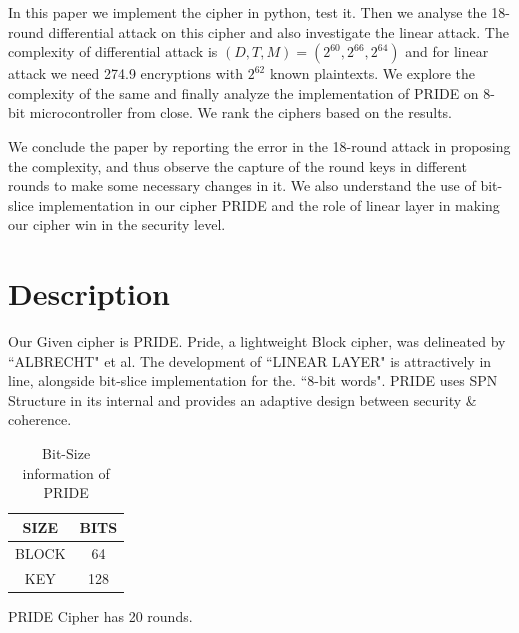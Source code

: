 \documentclass{transcrypto}
\begin{document}
	In this paper we implement the cipher in python, test it. Then we analyse the 18-round differential attack on this cipher and also investigate the linear attack. The complexity of differential attack is $ (D,T,M) = (2^{60},2^{66},2^{64}) $ and for linear attack we need 274.9 encryptions with $ 2^{62} $ known plaintexts. We explore the complexity of the same and finally analyze the implementation of PRIDE on 8-bit microcontroller from close. We rank the ciphers based on the results.
	
	We conclude the paper by reporting the error in the 18-round attack in proposing the complexity, and thus observe the capture of the round keys in different rounds to make some necessary changes in it. We also understand the use of bit-slice implementation in our cipher PRIDE and the role of linear layer in making our cipher win in the security level.
	\section{Description}
	Our Given cipher is PRIDE\cite{10.1007/978-3-662-44371-2_4}. Pride, a lightweight Block cipher, was delineated by ``ALBRECHT" et al. The development of ``LINEAR LAYER" is attractively in line, alongside bit-slice implementation for the.
	``8-bit words". PRIDE uses SPN Structure in its internal and provides an adaptive design between security \& coherence.

	\begin{table}[H]
		\centering
		\begin{tabular}{|c|c|}
			\hline
			\textbf{SIZE} & \textbf{BITS} \\ \hline
			BLOCK & 64\\ \hline
			KEY & 128\\ \hline
		\end{tabular}
		\caption{Bit-Size information of PRIDE}
	\end{table}
	PRIDE Cipher has 20 rounds.
	
\end{document}
